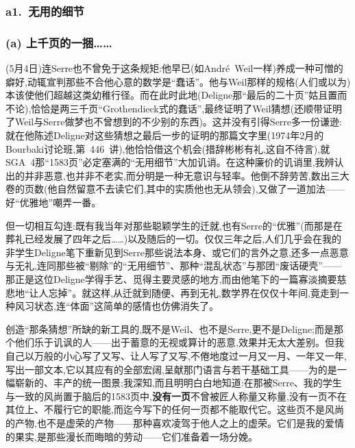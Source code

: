 \subsubsection*{a1.~无用的细节}



\subsubsection*{(a) 上千页的一捆……}


\noindent (5月4日)连Serre也不曾免于这条规矩:他早已(如André~Weil一样)养成一种可憎的癖好,动辄宣判那些不合他心意的数学是“蠢话”。他与Weil那样的规格(人们或以为)本该使他们超越这类幼稚行径。而在此时此地(Deligne那“最后的二十页”姑且置而不论),恰恰是两三千页“Grothendieck式的蠢话”,最终证明了Weil猜想(还顺带证明了Weil与Serre做梦也不曾想到的不少别的东西)。这并没有引得Serre多一份谦逊:就在他陈述Deligne对这些猜想之最后一步的证明的那篇文字里(1974年2月的Bourbaki讨论班,第~446~讲),他恰恰借这个机会(措辞彬彬有礼,这自不待言),就SGA~4那“1583页”必定塞满的“无用细节”大加讥诮。在这种廉价的讥诮里,我辨认出的并非恶意,也并非不老实,而分明是一种无意识与轻率。他倒不辞劳苦,数出三大卷的页数(他自然留意不去读它们,其中的实质他也无从领会),又做了一道加法——好“优雅地”嘲弄一番。

\dmark{}但一切相互勾连:既有我当年对那些聪颖学生的迁就,也有Serre的“优雅”(而那是在葬礼已经发展了四年之后……)以及随后的一切。仅仅三年之后,人们几乎会在我的非学生Deligne笔下重新见到Serre那些说法本身、或它们的言外之意,还多一点恶意与无礼,连同那些被“剔除”的“无用细节”、那种“混乱状态”与那团“废话硬壳”——那正是这位Deligne学得手艺、觅得主要灵感的地方,而由他笔下的一篇寡淡摘要慈悲地“让人忘掉”。就这样,从迁就到随便、再到无礼,数学界在仅仅十年间,竟走到一种风习状态,连“体面”这简单的感情也仿佛消失了。

创造“那条猜想”所缺的新工具的,既不是Weil、也不是Serre,更不是Deligne;而是那个他们乐于讥讽的人——出于蓄意的无视或算计的恶意,效果并无太大差别。但我自己以万般的小心写了又写、让人写了又写,不倦地度过一月又一月、一年又一年,写出一部文本,它以其应有的全部宏阔,呈献那门语言与若干基础工具——为的是一幅崭新的、丰产的统一图景;我深知,而且明明白白地知道:在那被Serre、我的学生与一致的风尚置于脑后的1583页中,\textbf{没有一页}不曾被匠人称量又称量,没有一页不在其位上、不履行它的职能,而迄今写下的任何一页都不能取代它。这些页不是风尚的产物,也不是虚荣的产物——那种喜欢凌驾于他人之上的虚荣。它们是我的爱情的果实,是那些漫长而晦暗的劳动——它们准备着一场分娩。

